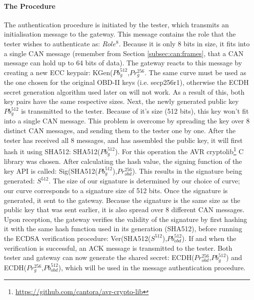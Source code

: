 \paragraph{The Procedure}

The authentication procedure is initiated by the tester, which transmits an initialisation message to the gateway. This message contains the role that the tester wishes to authenticate as: $Role^8$. Because it is only 8 bits in size, it fits into a single CAN message (remember from Section \ref{subsec:can:frames}, that a CAN message can hold up to 64 bits of data). The gateway reacts to this message by creating a new ECC keypair: KGen($Pb_g^{512}$,$Pr_g^{256}$. The same curve must be used as the one chosen for the original OBD-II keys (i.e. secp256r1), otherwise the ECDH secret generation algorithm used later on will not work. As a result of this, both key pairs have the same respective sizes. Next, the newly generated public key $Pb_g^{512}$ is transmitted to the tester. Because of it's size (512 bits), this key won't fit into a single CAN message. This problem is overcome by spreading the key over 8 distinct CAN messages, and sending them to the tester one by one. After the tester has received all 8 messages, and has assembled the public key, it will first hash it using SHA512: SHA512($Pb_g^{512}$). For this operation the AVR cryptolib\footnote{\url{https://github.com/cantora/avr-crypto-lib}} C library was chosen. After calculating the hash value, the signing function of the key API is called: Sig(SHA512($Pb_g^{512}$),$Pr_{obd}^{256}$). This results in the signature being generated: $S^{512}$. The size of our signature is determined by our choice of curve; our curve corresponds to a signature size of 512 bits. Once the signature is generated, it sent to the gateway. Because the signature is the same size as the public key that was sent earlier, it is also spread over 8 different CAN messages. Upon reception, the gateway verifies the validity of the signature by first hashing it with the same hash function used in its generation (SHA512), before running the ECDSA verification procedure: Ver(SHA512($S^{512}$),$Pb_{obd}^{512}$). If and when the verification is successful, an ACK message is transmitted to the tester. Both tester and gateway can now generate the shared secret: ECDH($Pr_{obd}^{256}$,$Pb_g^{512}$) and ECDH($Pr_g^{256}$,$Pb_{obd}^{512}$), which will be used in the message authentication procedure.

